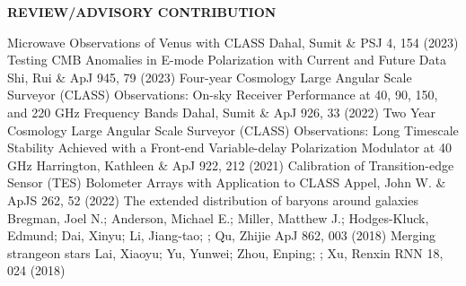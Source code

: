 \begin{footnotesize}
\textsf{\textbf{REVIEW/ADVISORY CONTRIBUTION}}
\end{footnotesize}
\begin{etaremune}[topsep=0pt,itemsep=0pt,partopsep=0pt,parsep=0pt]
            {Microwave Observations of Venus with CLASS}
            {Dahal, Sumit \& \bf\class}
            {PSJ 4, 154 (2023)}
        {Testing CMB Anomalies in E-mode Polarization with Current and Future Data}
        {Shi, Rui \& \bf\class}
        {ApJ 945, 79 (2023)}
        {Four-year Cosmology Large Angular Scale Surveyor (CLASS) Observations: On-sky Receiver Performance at 40, 90, 150, and 220 GHz Frequency Bands}
        {Dahal, Sumit \& \bf\class}
        {ApJ 926, 33 (2022)}
        {Two Year Cosmology Large Angular Scale Surveyor (CLASS) Observations: Long Timescale Stability Achieved with a Front-end Variable-delay Polarization Modulator at 40 GHz}
        {Harrington, Kathleen \& \bf\class}
        {ApJ 922, 212 (2021)}
            {Calibration of Transition-edge Sensor (TES) Bolometer Arrays with Application to CLASS}
            {Appel, John W. \& \bf\class}
            {ApJS 262, 52 (2022)}
            {The extended distribution of baryons around galaxies}
            {Bregman, Joel N.; Anderson, Michael E.; Miller, Matthew J.; Hodges-Kluck, Edmund; Dai, Xinyu; Li, Jiang-tao; \bfyl; Qu, Zhijie}
            {ApJ 862, 003 (2018)}
            {Merging strangeon stars}
            {Lai, Xiaoyu; Yu, Yunwei; Zhou, Enping; \bfyl; Xu, Renxin}
            {RNN 18, 024 (2018)}
\end{etaremune}